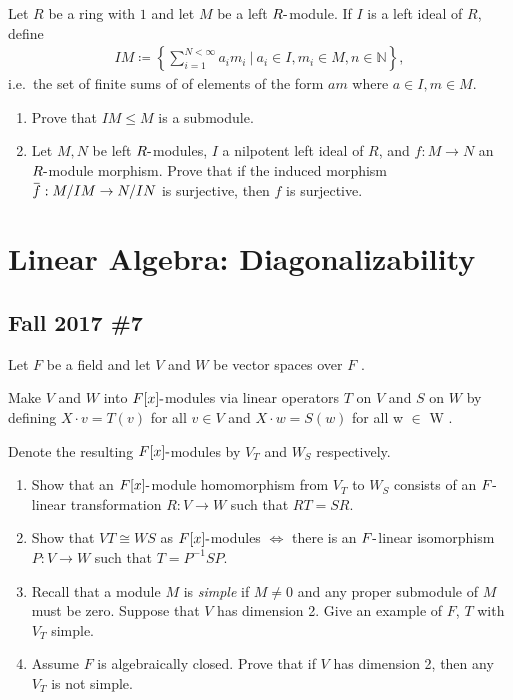 Let \(R\) be a ring with \(1\) and let \(M\) be a left
\(R{\hbox{-}}\)module. If \(I\) is a left ideal of \(R\), define
\begin{align*}
IM \coloneqq\left\{{ \sum_{i=1}^{N < \infty} a_i m_i {~\mathrel{\Big\vert}~}a_i \in I, m_i \in M, n\in {\mathbb{N}}}\right\}
,\end{align*}
i.e.~the set of finite sums of of elements of the form \(am\) where
\(a\in I, m\in M\).

\begin{enumerate}
\def\labelenumi{\alph{enumi}.}
\item
  Prove that \(IM \leq M\) is a submodule.
\item
  Let \(M, N\) be left \(R{\hbox{-}}\)modules, \(I\) a nilpotent left
  ideal of \(R\), and \(f: M\to N\) an \(R{\hbox{-}}\)module morphism.
  Prove that if the induced morphism
  \(\mkern 1.5mu\overline{\mkern-1.5muf\mkern-1.5mu}\mkern 1.5mu: M/IM \to N/IN\)
  is surjective, then \(f\) is surjective.
\end{enumerate}

\hypertarget{linear-algebra-diagonalizability}{%
\section{Linear Algebra:
Diagonalizability}\label{linear-algebra-diagonalizability}}

\hypertarget{fall-2017-7}{%
\subsection{Fall 2017 \#7}\label{fall-2017-7}}

Let \(F\) be a field and let \(V\) and \(W\) be vector spaces over \(F\)
.

Make \(V\) and \(W\) into \(F[x]{\hbox{-}}\)modules via linear operators
\(T\) on \(V\) and \(S\) on \(W\) by defining \(X \cdot v = T (v)\) for
all \(v \in V\) and \(X \cdot w = S(w)\) for all w \(\in\) W .

Denote the resulting \(F[x]{\hbox{-}}\)modules by \(V_T\) and \(W_S\)
respectively.

\begin{enumerate}
\def\labelenumi{\alph{enumi}.}
\item
  Show that an \(F[x]{\hbox{-}}\)module homomorphism from \(V_T\) to
  \(W_S\) consists of an \(F{\hbox{-}}\)linear transformation
  \(R : V \to W\) such that \(RT = SR\).
\item
  Show that \(VT \cong WS\) as \(F[x]{\hbox{-}}\)modules \(\iff\) there
  is an \(F{\hbox{-}}\)linear isomorphism \(P : V \to W\) such that
  \(T = P^{-1}SP\).
\item
  Recall that a module \(M\) is \emph{simple} if \(M \neq 0\) and any
  proper submodule of \(M\) must be zero. Suppose that \(V\) has
  dimension 2. Give an example of \(F\), \(T\) with \(V_T\) simple.
\item
  Assume \(F\) is algebraically closed. Prove that if \(V\) has
  dimension 2, then any \(V_T\) is not simple.
\end{enumerate}

